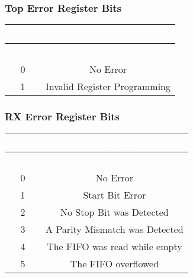 \subsubsection{Top Error Register Bits}
\renewcommand*{\arraystretch}{1.25}
\begingroup
\small
{}
\begin{longtable}{|c|c|}
    \hline
    \rowcolor{gray}
    \textcolor{white}{Value} & \textcolor{white}{Description}  \\ \hline
    \endfirsthead

    \hline
    \rowcolor{gray}
    \textcolor{white}{Value} & \textcolor{white}{Description}  \\ \hline
    \endhead

    \hline
    \endfoot

    0 & No Error \\ \hline
    1 & Invalid Register Programming \\ \hline
\end{longtable}
\label{table:uart_top_error}
\endgroup

\subsubsection{RX Error Register Bits}
\renewcommand*{\arraystretch}{1.25}
\begingroup
\small
{}
\begin{longtable}{|c|c|}
    \hline
    \rowcolor{gray}
    \textcolor{white}{Value} & \textcolor{white}{Description}  \\ \hline
    \endfirsthead

    \hline
    \rowcolor{gray}
    \textcolor{white}{Value} & \textcolor{white}{Description}  \\ \hline
    \endhead

    \hline
    \endfoot

    0 & No Error \\ \hline
    1 & Start Bit Error \\ \hline
    2 & No Stop Bit was Detected \\ \hline
    3 & A Parity Mismatch was Detected \\ \hline
    4 & The FIFO was read while empty \\ \hline
    5 & The FIFO overflowed \\ \hline
\end{longtable}
\label{table:uart_rx_error}
\endgroup

